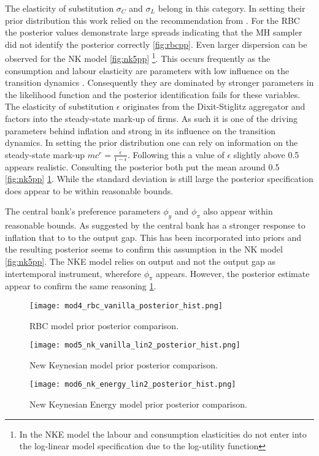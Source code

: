 \documentclass[12pt,a4paper,english]{article} %
\begin{document}
	The elasticity of substitution $\sigma_C$ and $\sigma_L$ belong in this category. In setting their prior distribution this work relied on the recommendation from \cite{del_negro_forming_2008}. For the RBC the posterior values demonstrate large spreads indicating that the MH sampler did not identify the posterior correctly \ref{fig:rbcpp}. Even larger dispersion can be observed for the NK model \ref{fig:nk5pp} \footnote{ In the \ac{NKE} model the labour and consumption elasticities do not enter into the log-linear model specification due to the log-utility function}. This occurs frequently as the consumption and labour elasticity are parameters with low influence on the transition dynamics \cite{guerron-quintana_bayesian_2013}. Consequently they are dominated by stronger parameters in the likelihood function and the posterior identification fails for these variables.
	The elasticity of substitution $\epsilon$ originates from the Dixit-Stiglitz aggregator and factors into the steady-state mark-up of firms. As such it is one of the driving parameters behind inflation and strong in its influence on the transition dynamics. In setting the prior distribution one can rely on information on the steady-state mark-up $mc^r = \frac{\epsilon}{1-\epsilon}$. Following this a value of $\epsilon$ slightly above 0.5 appears realistic. Consulting the posterior both put the mean around 0.5 \ref{fig:nk5pp} \ref{fig:nk6pp}. While the standard deviation is still large the posterior specification does appear to be within reasonable bounds. 
	
	The central bank's preference parameters $\phi_y$ and $\phi_{\pi}$ also appear within reasonable bounds. As suggested by \cite{gali_monetary_2008} the central bank has a stronger response to inflation that to to the output gap. This has been incorporated into priors and the resulting posterior seems to confirm this assumption in the NK model \ref{fig:nk5pp}. The NKE model relies on output and not the output gap as intertemporal instrument, wherefore $\phi_{\pi}$ appears. However, the posterior estimate appear to confirm the same reasoning \ref{fig:nk6pp}.
	\begin{figure}[H]
		\begin{center}
			\texttt{[image: mod4\_rbc\_vanilla\_posterior\_hist.png]}
			\caption{RBC model prior posterior comparison.}\label{fig:rbcpp}
			\texttt{[image: mod5\_nk\_vanilla\_lin2\_posterior\_hist.png]}
			\caption{New Keynesian model prior posterior comparison.}\label{fig:nk5pp}
			\texttt{[image: mod6\_nk\_energy\_lin2\_posterior\_hist.png]}
			\caption{New Keynesian Energy model prior posterior comparison.}\label{fig:nk6pp}
		\end{center}
	\end{figure}
	\pagebreak
		
\end{document}

